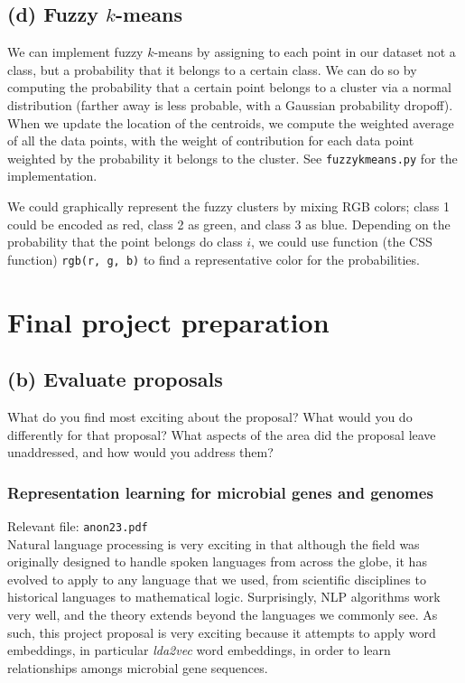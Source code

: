 \documentclass[11pt]{article}
\begin{document}
\subsection*{(d) Fuzzy $k$-means}
We can implement fuzzy $k$-means by assigning to each point in our
dataset not a class, but a probability that it belongs to a certain
class. We can do so by computing the probability that a certain
point belongs to a cluster via a normal distribution (farther away
is less probable, with a Gaussian probability dropoff). When we
update the location of the centroids, we compute the weighted average
of all the data points, with the weight of contribution for each
data point weighted by the probability it belongs to the cluster.
See {\tt fuzzykmeans.py} for the implementation.

We could graphically represent the fuzzy clusters by mixing RGB colors;
class 1 could be encoded as red, class 2 as green, and class 3 as blue.
Depending on the probability that the point belongs do class $i$, we could
use function (the CSS function) {\tt rgb(r, g, b)} to find a representative
color for the probabilities.

\section{Final project preparation}
\subsection*{(b) Evaluate proposals}
What do you find most exciting about the proposal?
What would you do differently for that proposal?
What aspects of the area did the proposal leave unaddressed, and how would you address them?

\subsubsection*{Representation learning for microbial genes and genomes}
Relevant file: {\tt anon23.pdf}\\
Natural language processing is very exciting in that although the field
was originally designed to handle spoken languages from across the globe,
it has evolved to apply to any language that we used, from scientific disciplines
to historical languages to mathematical logic. Surprisingly, NLP algorithms
work very well, and the theory extends beyond the languages we commonly
see. As such, this project proposal is very exciting because it attempts to
apply word embeddings, in particular {\it lda2vec} word embeddings, in
order to learn relationships amongs microbial gene sequences.
\end{document}
